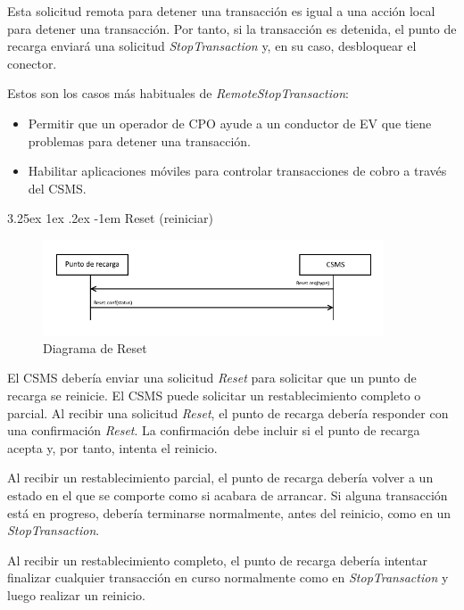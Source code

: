 \documentclass[12pt,a4paper,onecolumn,oneside]{report}
\makeatletter
\renewcommand\paragraph{\@startsection{paragraph}{5}{\z@}%
  {3.25ex \@plus1ex \@minus.2ex}%
  {-1em}%
  {\normalfont\normalsize\bfseries}}
\makeatother
\begin{document}
Esta solicitud remota para detener una transacción es igual a una acción local para detener una transacción. Por tanto, si la transacción es detenida, el punto de recarga enviará una solicitud \textit{StopTransaction} y, en su caso, desbloquear el conector.

Estos son los casos más habituales de \textit{RemoteStopTransaction}:
\begin{itemize}
\item Permitir que un operador de CPO ayude a un conductor de EV que tiene problemas para detener una transacción.
\item Habilitar aplicaciones móviles para controlar transacciones de cobro a través del CSMS.

\end{itemize}


\paragraph{Reset (reiniciar)}
\label{Reset (reiniciar)}


\begin{figure}[H] 
\centering
  \includegraphics[width=0.9\textwidth]{figuras/diagramareset.png}
  \caption[Diagrama de \textit{Reset}]{Diagrama de Reset\\
  }
  \label{fig:diagramareset}
\end{figure}


El CSMS debería enviar una solicitud \textit{Reset} para solicitar que un punto de recarga se reinicie. El CSMS puede solicitar un restablecimiento completo o parcial. Al recibir una solicitud \textit{Reset}, el punto de recarga debería responder con una confirmación \textit{Reset}. La confirmación debe incluir si el punto de recarga acepta y, por tanto, intenta el reinicio.

Al recibir un restablecimiento parcial, el punto de recarga debería volver a un estado en el que se comporte como si acabara de arrancar. Si alguna transacción está en progreso, debería terminarse normalmente, antes del reinicio, como en un \textit{StopTransaction}.

Al recibir un restablecimiento completo, el punto de recarga debería intentar finalizar cualquier transacción en curso normalmente como en \textit{StopTransaction} y luego realizar un reinicio.
\end{document}
